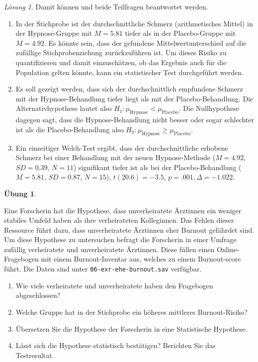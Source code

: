 \documentclass[
]{book}
\providecommand{\tightlist}{%
  \setlength{\itemsep}{0pt}\setlength{\parskip}{0pt}}
\theoremstyle{definition}
\theoremstyle{definition}
\theoremstyle{definition}
\newtheorem{exercise}{Übung}[chapter]
\theoremstyle{definition}
\theoremstyle{remark}
\newtheorem*{solution}{Lösung}
\begin{document}
\begin{solution}
Damit können und beide Teilfragen beantwortet werden.

\begin{enumerate}
\def\labelenumi{\alph{enumi})}
\tightlist
\item
  In der Stichprobe ist der durchschnittliche Schmerz (arithmetisches Mittel) in der Hypnose-Gruppe mit \(M = 5.81\) tiefer als in der Placebo-Gruppe mit \(M = 4.92\). Es könnte sein, dass der gefundene Mittelwertunterschied auf die zufällige Stichprobenziehung zurückzuführen ist. Um dieses Risiko zu quantifizieren und damit einzuschätzen, ob das Ergebnis auch für die Population gelten könnte, kann ein statistischer Test durchgeführt werden.
\item
  Es soll gezeigt werden, dass sich der durchschnittlich empfundene Schmerz mit der Hypnose-Behandlung tiefer liegt als mit der Placebo-Behandlung. Die Alternativhypothese lautet also \(H_1: \mu_\text{Hypnose} < \mu_\text{Placebo}\). Die Nullhypothese dagegen sagt, dass die Hypnose-Behandlung nicht besser oder sogar schlechter ist als die Placebo-Behandlung also \(H_0: \mu_\text{Hypnose} \geq \mu_\text{Placebo}\).
\item
  Ein einseitiger Welch-Test ergibt, dass der durchschnittliche erhobene Schmerz bei einer Behandlung mit der neuen Hypnose-Methode (\(M = 4.92\), \(SD = 0.39\), \(N = 11\)) signifikant tiefer ist als bei der Placebo-Behandlung (\(M = 5.81\), \(SD = 0.87\), \(N = 15\)), \(t(20.6) = -3.5\), \(p = .001, \Delta = -1.022\).
\end{enumerate}

\end{solution}

\begin{exercise}
\protect\hypertarget{exr:ehe-burnout}{}\label{exr:ehe-burnout}\leavevmode

Eine Forscherin hat die Hypothese, dass unverheiratete Ärztinnen ein weniger stabiles Umfeld haben als ihre verheirateten Kolleginnen. Das Fehlen dieser Ressource führt dazu, dass unverheiratete Ärztinnen eher Burnout gefährdet sind. Um diese Hypothese zu untersuchen befragt die Forscherin in einer Umfrage zufällig verheiratete und unverheiratete Ärztinnen. Diese füllen einen Online-Fragebogen mit einem Burnout-Inventar aus, welches zu einem Burnout-score führt. Die Daten sind unter \texttt{06-exr-ehe-burnout.sav} verfügbar.

\begin{enumerate}
\def\labelenumi{\alph{enumi})}
\tightlist
\item
  Wie viele verheiratete und unverheiratete haben den Fragebogen abgeschlossen?
\item
  Welche Gruppe hat in der Stichprobe ein höheres mittleres Burnout-Risiko?
\item
  Übersetzen Sie die Hypothese der Forscherin in eine Statistische Hypothese.
\item
  Lässt sich die Hypothese statistisch bestätigen? Berichten Sie das Testresultat.
\end{enumerate}

\end{exercise}
\end{document}
